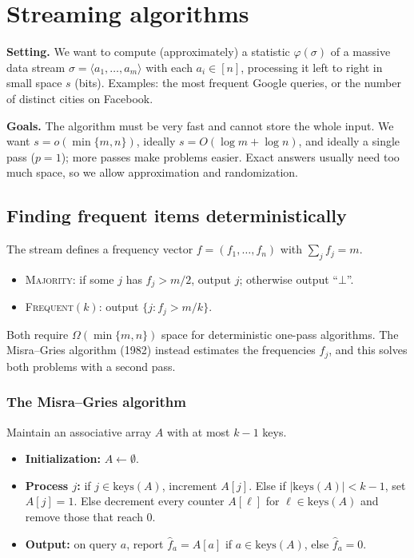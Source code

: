 % 
\chapter{Streaming algorithms}
 
\textbf{Setting.} We want to compute (approximately) a statistic $\varphi(\sigma)$ of a massive data stream $\sigma=\langle a_1,\ldots,a_m\rangle$ with each $a_i\in[n]$, processing it left to right in small space $s$ (bits). Examples: the most frequent Google queries, or the number of distinct cities on Facebook.
 
\textbf{Goals.} The algorithm must be very fast and cannot store the whole input. We want $s=o(\min\{m,n\})$, ideally $s=O(\log m+\log n)$, and ideally a single pass ($p=1$); more passes make problems easier. Exact answers usually need too much space, so we allow approximation and randomization.
 
\section{Finding frequent items deterministically}
 
The stream defines a frequency vector $f=(f_1,\ldots,f_n)$ with $\sum_j f_j=m$.
\begin{itemize}
  \item \textsc{Majority}: if some $j$ has $f_j>m/2$, output $j$; otherwise output ``$\bot$''.
  \item \textsc{Frequent}$(k)$: output $\{j:f_j>m/k\}$.
\end{itemize}
Both require $\Omega(\min\{m,n\})$ space for deterministic one-pass algorithms. The Misra--Gries algorithm (1982) instead estimates the frequencies $f_j$, and this solves both problems with a second pass.
 
\subsection{The Misra--Gries algorithm}
 
Maintain an associative array $A$ with at most $k-1$ keys.
\begin{itemize}
  \item \textbf{Initialization:} $A\leftarrow\emptyset$.
  \item \textbf{Process $j$:} if $j\in\mathrm{keys}(A)$, increment $A[j]$. Else if $|\mathrm{keys}(A)|<k-1$, set $A[j]=1$. Else decrement every counter $A[\ell]$ for $\ell\in\mathrm{keys}(A)$ and remove those that reach $0$.
  \item \textbf{Output:} on query $a$, report $\hat f_a=A[a]$ if $a\in\mathrm{keys}(A)$, else $\hat f_a=0$.
\end{itemize}
 
